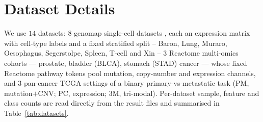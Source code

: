 \documentclass[letterpaper]{article}
\begin{document}
\section{Dataset Details}
\label{app:data}
We use $14$ datasets: $8$ genomap single-cell datasets \cite{islam2023cartography}, each an
expression matrix with cell-type labels and a fixed stratified split -- Baron, Lung, Muraro, Oesophagus,
Segerstolpe, Spleen, T-cell and Xin -- $3$ Reactome multi-omics
cohorts --- prostate, bladder (BLCA), stomach (STAD) cancer --- whose fixed Reactome pathway tokens pool mutation,
copy-number and expression channels, and $3$ pan-cancer TCGA settings of a binary
primary-vs-metastatic task (PM, mutation$+$CNV; PC, expression; 3M, tri-modal). Per-dataset
sample, feature and class counts are read directly from the result files and summarised in
Table~\ref{tab:datasets}.

\begin{table}[h]
\centering
{}
\caption{The datasets used throughout ($14$ in total): $8$ genomap single-cell suites,
$3$ Reactome multi-omics cohorts, and $3$ pan-cancer TCGA settings (PM, PC, 3M).
Counts are read directly from the result files.}
\label{tab:datasets}
\end{table}
\end{document}
